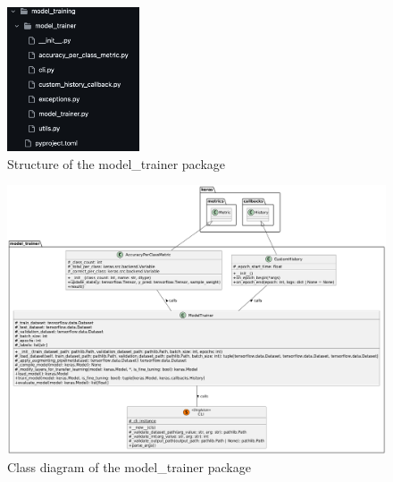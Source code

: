 \documentclass{BachelorBUI}
\begin{document}
        \begin{figure}[h]
            \centering
            \includegraphics[width=0.35\textwidth]{model_trainer_package_github.png}
            \caption{\centering Structure of the model\_trainer package}
            \label{fig:model-trainer-package-github}
        \end{figure}

        \begin{figure}[h]
            \centering
            \includegraphics[width=\textwidth]{class_diagram_model_trainer.png}
            \caption{\centering Class diagram of the model\_trainer package}
            \label{fig:classs-diagram-model-trainer-package}
        \end{figure}

\end{document}
